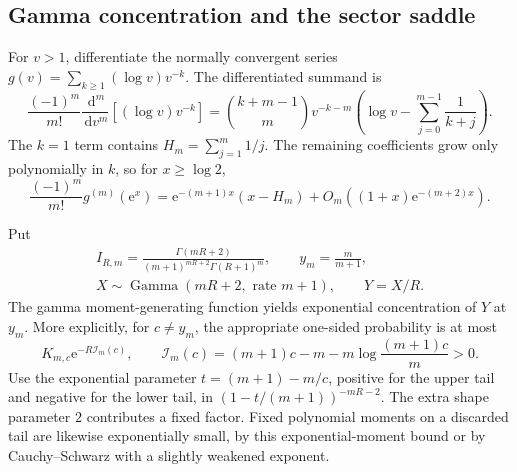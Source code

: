 \documentclass[11pt,letterpaper]{article}
\theoremstyle{remark}\newtheorem{remark}[theorem]{Remark}
\newcommand{\ee}{\mathrm e}
\newcommand{\dd}{\,\mathrm d}
\DeclareMathOperator{\GammaDist}{Gamma}
\begin{document}
\subsection{Gamma concentration and the sector saddle}
For $v>1$, differentiate the normally convergent series $g(v)=\sum_{k\ge1}(\log v)v^{-k}$. The differentiated summand is
\[
 \frac{(-1)^m}{m!}\frac{\dd^m}{\dd v^m}[(\log v)v^{-k}]
 =\binom{k+m-1}{m}v^{-k-m}
 \left(\log v-\sum_{j=0}^{m-1}\frac1{k+j}\right).
\]
The $k=1$ term contains $H_m=\sum_{j=1}^m1/j$. The remaining coefficients grow only polynomially in $k$, so for $x\ge\log2$,
\begin{equation}\label{amc:bm:cap:deriv-asym}
 \frac{(-1)^m}{m!}g^{(m)}(\ee^x)
 =\ee^{-(m+1)x}(x-H_m)
 +O_m((1+x)\ee^{-(m+2)x}).
\end{equation}

Put
\begin{equation}\label{amc:bm:cap:gamma-scale}
 \begin{gathered}
 I_{R,m}=\frac{\Gamma(mR+2)}{(m+1)^{mR+2}\Gamma(R+1)^m},\qquad
 y_m=\frac m{m+1},\\
 X\sim\GammaDist(mR+2,\text{ rate }m+1),\qquad Y=X/R.
 \end{gathered}
\end{equation}
The gamma moment-generating function yields exponential concentration of $Y$ at $y_m$. More explicitly, for $c\ne y_m$, the appropriate one-sided probability is at most
\begin{equation}\label{amc:bm:cap:gamma-concentration}
 K_{m,c}\ee^{-R\mathcal I_m(c)},\qquad
 \mathcal I_m(c)=(m+1)c-m-m\log\frac{(m+1)c}{m}>0.
\end{equation}
Use the exponential parameter $t=(m+1)-m/c$, positive for the upper tail and negative for the lower tail, in $(1-t/(m+1))^{-mR-2}$. The extra shape parameter $2$ contributes a fixed factor. Fixed polynomial moments on a discarded tail are likewise exponentially small, by this exponential-moment bound or by Cauchy--Schwarz with a slightly weakened exponent.
\end{document}
